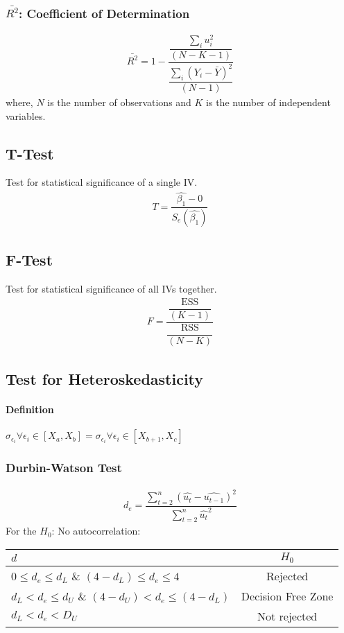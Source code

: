 \documentclass[openany,b5paper]{article}
\begin{document}
\subsubsection{$\bar{R^2}$: Coefficient of Determination}
\begin{align}
	\bar{R^2}= 1 - \dfrac{\dfrac{\sum_i u_i^2}{(N-K-1)}}{\dfrac{\sum_i (Y_i-\bar{Y})^2}{(N-1)}}
\end{align}
where, $N$ is the number of observations and $K$ is the number of independent variables.

\subsection{T-Test}
Test for statistical significance of a single IV.
\begin{align}
	T = \dfrac{\hat{\beta_1}-0}{S_e(\hat{\beta_1})}
\end{align}
\subsection{F-Test}
Test for statistical significance of all IVs together.
\begin{align}
	F = \dfrac{\dfrac{\text{ESS}}{(K-1)}}{\dfrac{\text{RSS}}{(N-K)}} \tag{$F \geq F_c, H_0$ is rejected}
\end{align}

\subsection{Test for Heteroskedasticity}
\paragraph{Definition} $\sigma_{\epsilon_i} \forall  \epsilon_i \in [X_a, X_b] = \sigma_{\epsilon_i} \forall  \epsilon_i \in [X_{b+1}, X_c]$
\subsubsection{Durbin-Watson Test}
\begin{align}
	d_e = \dfrac{\sum_{t=2}^{n} (\hat{u_t}-\hat{u_{t-1}})^2}{\sum_{t=2}^{n} \hat{u_t}^2}
\end{align}
For the $H_0$: No autocorrelation:
\begin{table}[!h]
	\centering
	\begin{tabular}{l|c}
		$d$ & $H_0$\\
		\hline
		$0 \leq d_e \leq d_L$ \& $(4-d_L) \leq d_e \leq 4$ & Rejected\\
		$d_L < d_e \leq d_U$ \& $(4-d_U) < d_e \leq (4-d_L)$ & Decision Free Zone\\
		$d_L < d_e < D_U$ & Not rejected
	\end{tabular}
\end{table}
\end{document}
